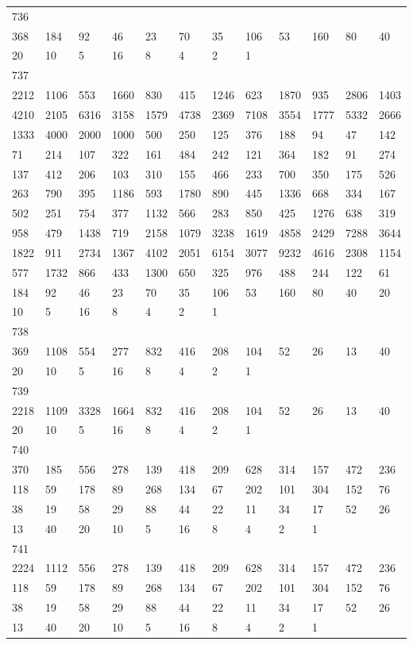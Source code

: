 \begin{longtable}{llllllllllll}
736&&&&&&&&&&&\\
368& 184& 92& 46& 23& 70& 35& 106& 53& 160& 80& 40\\
20& 10& 5& 16& 8& 4& 2& 1& \\

737&&&&&&&&&&&\\
2212& 1106& 553& 1660& 830& 415& 1246& 623& 1870& 935& 2806& 1403\\
4210& 2105& 6316& 3158& 1579& 4738& 2369& 7108& 3554& 1777& 5332& 2666\\
1333& 4000& 2000& 1000& 500& 250& 125& 376& 188& 94& 47& 142\\
71& 214& 107& 322& 161& 484& 242& 121& 364& 182& 91& 274\\
137& 412& 206& 103& 310& 155& 466& 233& 700& 350& 175& 526\\
263& 790& 395& 1186& 593& 1780& 890& 445& 1336& 668& 334& 167\\
502& 251& 754& 377& 1132& 566& 283& 850& 425& 1276& 638& 319\\
958& 479& 1438& 719& 2158& 1079& 3238& 1619& 4858& 2429& 7288& 3644\\
1822& 911& 2734& 1367& 4102& 2051& 6154& 3077& 9232& 4616& 2308& 1154\\
577& 1732& 866& 433& 1300& 650& 325& 976& 488& 244& 122& 61\\
184& 92& 46& 23& 70& 35& 106& 53& 160& 80& 40& 20\\
10& 5& 16& 8& 4& 2& 1& \\

738&&&&&&&&&&&\\
369& 1108& 554& 277& 832& 416& 208& 104& 52& 26& 13& 40\\
20& 10& 5& 16& 8& 4& 2& 1& \\

739&&&&&&&&&&&\\
2218& 1109& 3328& 1664& 832& 416& 208& 104& 52& 26& 13& 40\\
20& 10& 5& 16& 8& 4& 2& 1& \\

740&&&&&&&&&&&\\
370& 185& 556& 278& 139& 418& 209& 628& 314& 157& 472& 236\\
118& 59& 178& 89& 268& 134& 67& 202& 101& 304& 152& 76\\
38& 19& 58& 29& 88& 44& 22& 11& 34& 17& 52& 26\\
13& 40& 20& 10& 5& 16& 8& 4& 2& 1& \\

741&&&&&&&&&&&\\
2224& 1112& 556& 278& 139& 418& 209& 628& 314& 157& 472& 236\\
118& 59& 178& 89& 268& 134& 67& 202& 101& 304& 152& 76\\
38& 19& 58& 29& 88& 44& 22& 11& 34& 17& 52& 26\\
13& 40& 20& 10& 5& 16& 8& 4& 2& 1& \\


\end{longtable}
